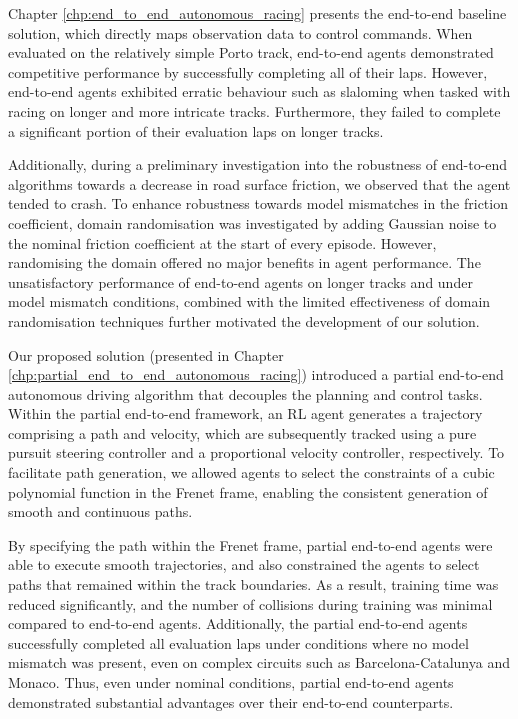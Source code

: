 Chapter \ref{chp:end_to_end_autonomous_racing} presents the end-to-end baseline solution, which directly maps observation data to control commands.
When evaluated on the relatively simple Porto track, end-to-end agents demonstrated competitive performance by successfully completing all of their laps.
However, end-to-end agents exhibited erratic behaviour such as slaloming when tasked with racing on longer and more intricate tracks.
Furthermore, they failed to complete a significant portion of their evaluation laps on longer tracks.


Additionally, during a preliminary investigation into the robustness of end-to-end algorithms towards a decrease in road surface friction, we observed that the agent tended to crash.
To enhance robustness towards model mismatches in the friction coefficient, domain randomisation was investigated by adding Gaussian noise to the nominal friction coefficient at the start of every episode.
However, randomising the domain offered no major benefits in agent performance.
The unsatisfactory performance of end-to-end agents on longer tracks and under model mismatch conditions, combined with the limited effectiveness of domain randomisation techniques further motivated the development of our solution.


Our proposed solution (presented in Chapter \ref{chp:partial_end_to_end_autonomous_racing}) introduced a partial end-to-end autonomous driving algorithm  that decouples the planning and control tasks.
Within the partial end-to-end framework, an RL agent generates a trajectory comprising a path and velocity, which are subsequently tracked using a pure pursuit steering controller and a proportional velocity controller, respectively.
To facilitate path generation, we allowed agents to select the constraints of a cubic polynomial function in the Frenet frame, enabling the consistent  generation of smooth and continuous paths.


By specifying the path within the Frenet frame, partial end-to-end agents were able to execute smooth trajectories, and also constrained the agents to select paths that remained within the track boundaries. 
As a result, training time was reduced significantly, and the number of collisions during training was minimal compared to end-to-end agents.
Additionally, the partial end-to-end agents successfully completed all evaluation laps under conditions where no model mismatch was present, even on complex circuits such as Barcelona-Catalunya and Monaco. 
Thus, even under nominal conditions, partial end-to-end agents demonstrated substantial advantages over their end-to-end counterparts.


